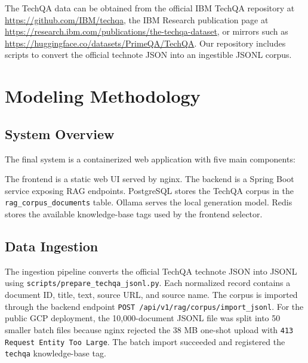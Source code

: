 \documentclass[paper=a4, fontsize=11pt]{scrartcl}
\begin{document}
The TechQA data can be obtained from the official IBM TechQA repository at \href{https://github.com/IBM/techqa}{https://github.com/IBM/techqa}, the IBM Research publication page at \href{https://research.ibm.com/publications/the-techqa-dataset}{https://research.ibm.com/publications/the-techqa-dataset}, or mirrors such as \href{https://huggingface.co/datasets/PrimeQA/TechQA}{https://huggingface.co/datasets/PrimeQA/TechQA}. Our repository includes scripts to convert the official technote JSON into an ingestible JSONL corpus.

\section{Modeling Methodology}

\subsection{System Overview}

The final system is a containerized web application with five main components:

\begin{center}
\end{center}

The frontend is a static web UI served by nginx. The backend is a Spring Boot service exposing RAG endpoints. PostgreSQL stores the TechQA corpus in the \texttt{rag\_corpus\_documents} table. Ollama serves the local generation model. Redis stores the available knowledge-base tags used by the frontend selector.

\subsection{Data Ingestion}

The ingestion pipeline converts the official TechQA technote JSON into JSONL using \texttt{scripts/prepare\_techqa\_jsonl.py}. Each normalized record contains a document ID, title, text, source URL, and source name. The corpus is imported through the backend endpoint \texttt{POST /api/v1/rag/corpus/import\_jsonl}. For the public GCP deployment, the 10,000-document JSONL file was split into 50 smaller batch files because nginx rejected the 38 MB one-shot upload with \texttt{413 Request Entity Too Large}. The batch import succeeded and registered the \texttt{techqa} knowledge-base tag.
\end{document}
